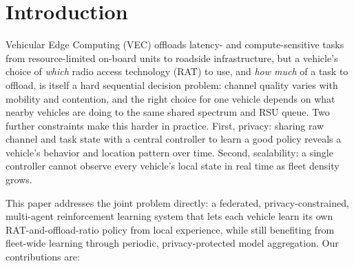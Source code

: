 \documentclass[journal,10pt,twocolumn]{IEEEtran}
\begin{document}
\section{Introduction}
Vehicular Edge Computing (VEC) offloads latency- and compute-sensitive tasks from resource-limited
on-board units to roadside infrastructure, but a vehicle's choice of \emph{which} radio access
technology (RAT) to use, and \emph{how much} of a task to offload, is itself a hard sequential
decision problem: channel quality varies with mobility and contention, and the right choice for
one vehicle depends on what nearby vehicles are doing to the same shared spectrum and RSU queue.
Two further constraints make this harder in practice. First, privacy: sharing raw channel and task
state with a central controller to learn a good policy reveals a vehicle's behavior and location
pattern over time. Second, scalability: a single controller cannot observe every vehicle's local
state in real time as fleet density grows.

This paper addresses the joint problem directly: a federated, privacy-constrained, multi-agent
reinforcement learning system that lets each vehicle learn its own RAT-and-offload-ratio policy
from local experience, while still benefiting from fleet-wide learning through periodic,
privacy-protected model aggregation. Our contributions are:
\end{document}
